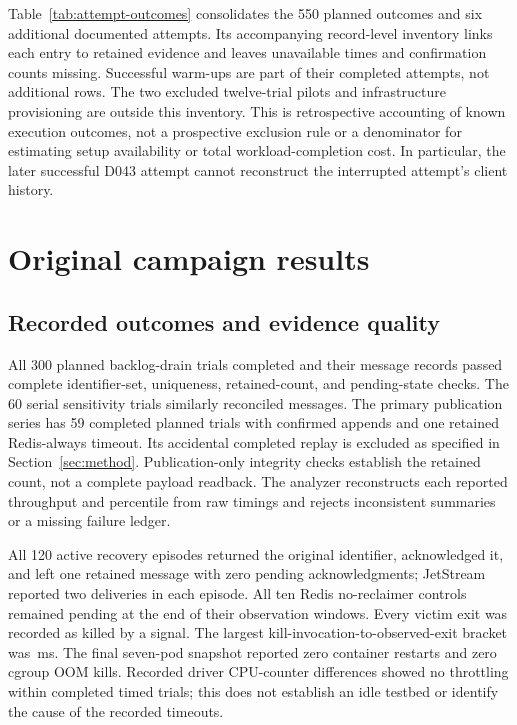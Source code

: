 \documentclass[11pt]{article}
\theoremstyle{definition}
\begin{document}
Table~\ref{tab:attempt-outcomes} consolidates the 550 planned outcomes and six additional documented attempts. Its accompanying record-level inventory links each entry to retained evidence and leaves unavailable times and confirmation counts missing. Successful warm-ups are part of their completed attempts, not additional rows. The two excluded twelve-trial pilots and infrastructure provisioning are outside this inventory. This is retrospective accounting of known execution outcomes, not a prospective exclusion rule or a denominator for estimating setup availability or total workload-completion cost. In particular, the later successful D043 attempt cannot reconstruct the interrupted attempt's client history.

\begin{table}[htbp]
\centering\small

\caption{Retained campaign outcomes and additional documented attempts. The first four rows account for all 550 planned outcomes. The remaining six attempts are separate from those outcomes. Counts do not reconstruct missing durations or establish end-to-end availability.}
\label{tab:attempt-outcomes}
\end{table}
\FloatBarrier


\section{Original campaign results}\label{sec:results}
\subsection{Recorded outcomes and evidence quality}
All 300 planned backlog-drain trials completed and their \MainMessages{} message records passed complete identifier-set, uniqueness, retained-count, and pending-state checks. The 60 serial sensitivity trials similarly reconciled \SerialMessages{} messages. The primary publication series has 59 completed planned trials with \TimedMessages{} confirmed appends and one retained Redis-always timeout. Its accidental completed replay is excluded as specified in Section~\ref{sec:method}. Publication-only integrity checks establish the retained count, not a complete payload readback. The analyzer reconstructs each reported throughput and percentile from raw timings and rejects inconsistent summaries or a missing failure ledger.

All 120 active recovery episodes returned the original identifier, acknowledged it, and left one retained message with zero pending acknowledgments; JetStream reported two deliveries in each episode. All ten Redis no-reclaimer controls remained pending at the end of their observation windows. Every victim exit was recorded as killed by a signal. The largest kill-invocation-to-observed-exit bracket was \KillBracket{}\,ms. The final seven-pod snapshot reported zero container restarts and zero cgroup OOM kills. Recorded driver CPU-counter differences showed no throttling within completed timed trials; this does not establish an idle testbed or identify the cause of the recorded timeouts.
\end{document}
